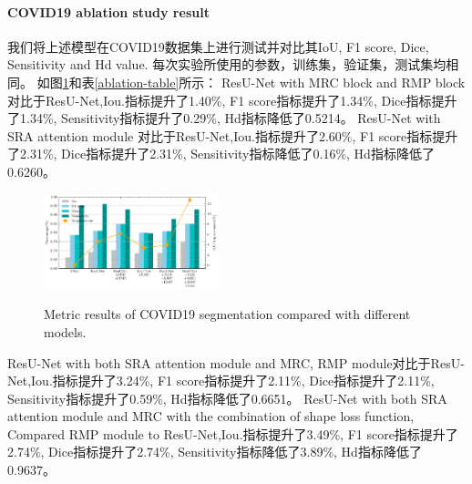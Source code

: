 \documentclass{ieeeaccess}
\begin{document}
  \paragraph{COVID19 ablation study result}
  我们将上述模型在COVID19数据集上进行测试并对比其IoU, F1 score, Dice, Sensitivity and Hd value. 每次实验所使用的参数，训练集，验证集，测试集均相同。
  如图\ref{fig:covid_comparison}和表\ref{ablation-table}所示：
  ResU-Net with MRC block and RMP block 对比于ResU-Net,Iou.指标提升了1.40\%, F1 score指标提升了1.34\%, Dice指标提升了1.34\%, Sensitivity指标提升了0.29\%, Hd指标降低了0.5214。
  ResU-Net with SRA attention module 对比于ResU-Net,Iou.指标提升了2.60\%, F1 score指标提升了2.31\%, Dice指标提升了2.31\%, Sensitivity指标降低了0.16\%, Hd指标降低了0.6260。
  \begin{figure}[htbp]
    \begin{center}
    \includegraphics[width=0.45\textwidth]{figure/covid_comparison.pdf}
    \vspace{-2mm}
    \caption{Metric results of COVID19 segmentation compared with different models.} 
    \vspace{-2mm}
    \label{fig:covid_comparison}
    \end{center}
    \vspace{-0.35cm}
  \end{figure}
  ResU-Net with both SRA attention module and MRC, RMP module对比于ResU-Net,Iou.指标提升了3.24\%, F1 score指标提升了2.11\%, Dice指标提升了2.11\%, Sensitivity指标提升了0.59\%, Hd指标降低了0.6651。
  ResU-Net with both SRA attention module and MRC with the combination of shape loss function, 
  Compared RMP module to ResU-Net,Iou.指标提升了3.49\%, F1 score指标提升了2.74\%, Dice指标提升了2.74\%, Sensitivity指标降低了3.89\%, Hd指标降低了0.9637。
  
\end{document}
